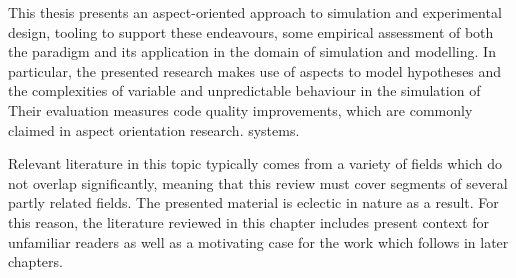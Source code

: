 %
%



This thesis presents an aspect-oriented approach to simulation and experimental
design, tooling to support these endeavours, some empirical assessment of both
the paradigm and its application in the domain of simulation and modelling. In
particular, the presented research makes use of aspects to model hypotheses and
the complexities of variable and unpredictable behaviour in the simulation of
\sociotechnical Their evaluation measures code quality improvements, which are
commonly claimed in aspect orientation research. systems.

Relevant literature in this topic typically comes from a variety of fields which
do not overlap significantly, meaning that this review must cover segments of
several partly related fields. The presented material is eclectic in nature as a
result. For this reason, the literature reviewed in this chapter includes
present context for unfamiliar readers as well as a motivating case for the work
which follows in later chapters.

